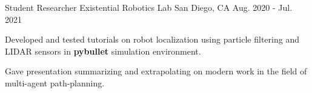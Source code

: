 \begin{cventries}
\cventry
  {Student Researcher} %
  {Existential Robotics Lab} %
  {San Diego, CA} %
  {Aug. 2020 - Jul. 2021} %
  {
    \begin{cvitems} %
      \item {Developed and tested tutorials on robot localization using particle filtering and LIDAR sensors in \textbf{pybullet} simulation environment.}
      \item {Gave presentation summarizing and extrapolating on modern work in the field of multi-agent path-planning.}
    \end{cvitems}
  }

\end{cventries}
